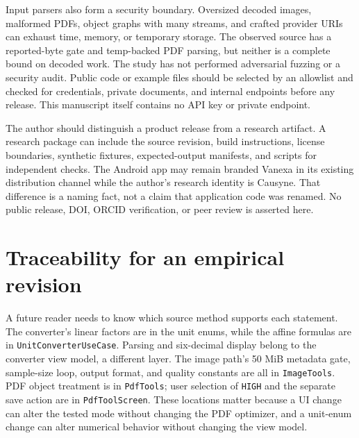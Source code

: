 \documentclass[10pt,letterpaper]{article}
\begin{document}
Input parsers also form a security boundary. Oversized decoded images, malformed PDFs, object graphs with many streams, and crafted provider URIs can exhaust time, memory, or temporary storage. The observed source has a reported-byte gate and temp-backed PDF parsing, but neither is a complete bound on decoded work. The study has not performed adversarial fuzzing or a security audit. Public code or example files should be selected by an allowlist and checked for credentials, private documents, and internal endpoints before any release. This manuscript itself contains no API key or private endpoint.

The author should distinguish a product release from a research artifact. A research package can include the source revision, build instructions, license boundaries, synthetic fixtures, expected-output manifests, and scripts for independent checks. The Android app may remain branded Vanexa in its existing distribution channel while the author's research identity is Causyne. That difference is a naming fact, not a claim that application code was renamed. No public release, DOI, ORCID verification, or peer review is asserted here.

\section{Traceability for an empirical revision}

A future reader needs to know which source method supports each statement. The converter's linear factors are in the unit enums, while the affine formulas are in \texttt{UnitConverterUseCase}. Parsing and six-decimal display belong to the converter view model, a different layer. The image path's 50 MiB metadata gate, sample-size loop, output format, and quality constants are all in \texttt{ImageTools}. PDF object treatment is in \texttt{PdfTools}; user selection of \texttt{HIGH} and the separate save action are in \texttt{PdfToolScreen}. These locations matter because a UI change can alter the tested mode without changing the PDF optimizer, and a unit-enum change can alter numerical behavior without changing the view model.
\end{document}
